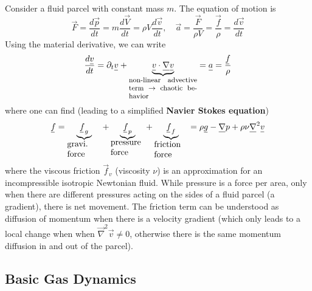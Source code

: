 Consider a fluid parcel with constant mass $m$. The equation of motion is
\begin{equation}
    \vec{F} = \frac{d\vec{p}}{dt} = m \frac{d\vec{V}}{dt} = \rho V \frac{d\vec{v}}{dt}, \quad \vec{a} = \frac{\vec{F}}{\rho V} = \frac{\vec{f}}{\rho} = \frac{d\vec{v}}{dt}
\end{equation}
Using the material derivative, we can write
\begin{equation}
    \frac{d\vec{v}}{dt} = \partial_t \vec{v} + \underbrace{\vec{v} \cdot \vec{\nabla} \vec{v}}_{\parbox{8em}{\footnotesize non-linear advective term $\rightarrow$ chaotic behavior}} = \vec{a} = \frac{\vec{f}}{\rho}
\end{equation}
where one can find (leading to a simplified \textbf{Navier Stokes equation})
\begin{equation}
    \vec{f} = \underbrace{\vec{f}_{g}}_{\parbox{4em}{gravi. force}} + \underbrace{\vec{f}_{p}}_{\parbox{4em}{pressure force}} + \underbrace{\vec{f}_{f}}_{\parbox{4em}{friction force}} = \rho \vec{g} - \vec{\nabla} p + \rho \nu \vec{\nabla}^2 \vec{v}
\end{equation}
where the viscous friction $\vec{f}_v$ (viscosity $\nu$) is an approximation for an incompressible isotropic Newtonian fluid.
While pressure is a force per area, only when there are different pressures acting on the sides of a fluid parcel (a gradient), there is net movement.
The friction term can be understood as diffusion of momentum when there is a velocity gradient (which only leads to a local change when
when $\vec{\nabla}^2 \vec{v} \neq 0$, otherwise there is the same momentum diffusion in and out of the parcel).

\subsection{Basic Gas Dynamics}
